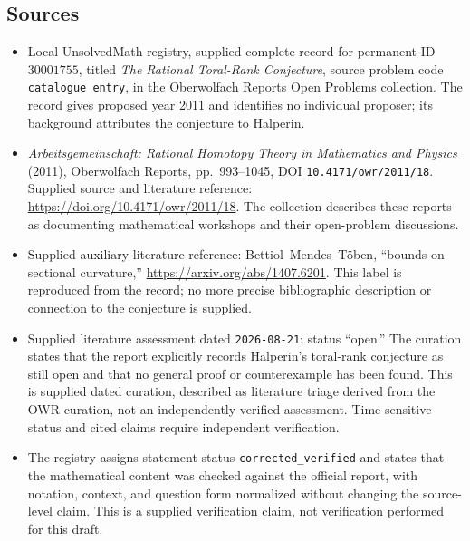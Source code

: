 \documentclass[11pt]{article}
\begin{document}
\subsection{Sources}
\begin{itemize}
\item Local UnsolvedMath registry, supplied complete record for permanent ID \(30001755\), titled \emph{The Rational Toral-Rank Conjecture}, source problem code \texttt{catalogue entry}, in the Oberwolfach Reports Open Problems collection. The record gives proposed year 2011 and identifies no individual proposer; its background attributes the conjecture to Halperin.
\item \emph{Arbeitsgemeinschaft: Rational Homotopy Theory in Mathematics and Physics} (2011), Oberwolfach Reports, pp.\ 993--1045, DOI \texttt{10.4171/owr/2011/18}. Supplied source and literature reference: \url{https://doi.org/10.4171/owr/2011/18}. The collection describes these reports as documenting mathematical workshops and their open-problem discussions.
\item Supplied auxiliary literature reference: Bettiol--Mendes--Töben, ``bounds on sectional curvature,'' \url{https://arxiv.org/abs/1407.6201}. This label is reproduced from the record; no more precise bibliographic description or connection to the conjecture is supplied.
\item Supplied literature assessment dated \texttt{2026-08-21}: status ``open.'' The curation states that the report explicitly records Halperin's toral-rank conjecture as still open and that no general proof or counterexample has been found. This is supplied dated curation, described as literature triage derived from the OWR curation, not an independently verified assessment. Time-sensitive status and cited claims require independent verification.
\item The registry assigns statement status \texttt{corrected\_verified} and states that the mathematical content was checked against the official report, with notation, context, and question form normalized without changing the source-level claim. This is a supplied verification claim, not verification performed for this draft.
\end{itemize}
\end{document}
